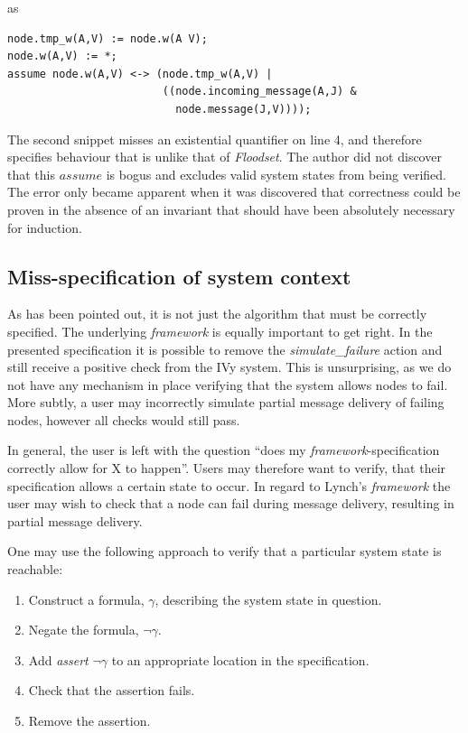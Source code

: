 \documentclass[fleqn]{article}
\begin{document}
\noindent as

\begin{mdframed}[nobreak=true, backgroundcolor=light-gray, roundcorner=10pt,leftmargin=1, rightmargin=1, innerleftmargin=15, innertopmargin=15,innerbottommargin=15, outerlinewidth=1, linecolor=light-gray]
\begin{lstlisting}
node.tmp_w(A,V) := node.w(A V);
node.w(A,V) := *;
assume node.w(A,V) <-> (node.tmp_w(A,V) |
                        ((node.incoming_message(A,J) &
                          node.message(J,V))));
\end{lstlisting}
\end{mdframed}
The second snippet misses an existential quantifier on line 4, and therefore specifies behaviour that is unlike that of \textit{Floodset}.  The author did not discover that this $assume$ is bogus and excludes valid system states from being verified. The error only became apparent when it was discovered that correctness could be proven in the absence of an invariant that should have been absolutely necessary for induction.


\subsection{Miss-specification of system context}
As has been pointed out, it is not just the algorithm that must be correctly specified. The underlying \textit{framework} is equally important to get right. In the presented specification it is possible to remove the \textit{simulate\_failure} action and still receive a positive check from the IVy system. This is unsurprising, as we do not have any mechanism in place verifying that the system allows nodes to fail. More subtly, a user may incorrectly simulate partial message delivery of failing nodes, however all checks would still pass.

In general, the user is left with the question ``does my \textit{framework}-specification correctly allow for X to happen''.  Users may therefore want to verify, that their specification allows a certain state to occur. In regard to Lynch's \textit{framework} the user may wish to check that a node can fail during message delivery, resulting in partial message delivery.

One may use the following approach to verify that a particular system state is reachable:
\begin{enumerate}
  \item Construct a formula, $\gamma$, describing the system state in question.
  \item Negate the formula, $\neg\gamma$.
  \item Add \textit{assert} $\neg\gamma$ to an appropriate location in the specification.
  \item Check that the assertion fails.
  \item Remove the assertion.
\end{enumerate}
\end{document}
